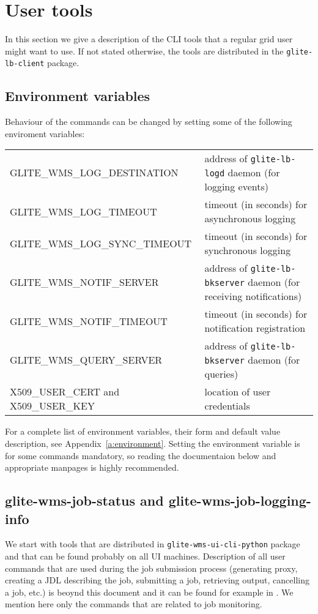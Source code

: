 \section{User tools}
\label{s:lb-tools}

In this section we give a description of the CLI tools that a regular grid user
might want to use. If not stated otherwise, the tools are distributed in the
\verb'glite-lb-client' package.

\subsection{Environment variables}

Behaviour of the commands can be changed by setting some of the following
enviroment variables:

\begin{tabularx}{\textwidth}{lX}
GLITE\_WMS\_LOG\_DESTINATION & address of \verb'glite-lb-logd' daemon (for logging events)\\
GLITE\_WMS\_LOG\_TIMEOUT & timeout (in seconds) for asynchronous logging\\
GLITE\_WMS\_LOG\_SYNC\_TIMEOUT & timeout (in seconds) for synchronous logging\\
GLITE\_WMS\_NOTIF\_SERVER& address of \verb'glite-lb-bkserver' daemon (for receiving notifications)\\
GLITE\_WMS\_NOTIF\_TIMEOUT& timeout (in seconds) for notification registration\\
GLITE\_WMS\_QUERY\_SERVER& address of \verb'glite-lb-bkserver' daemon (for queries)\\
X509\_USER\_CERT and X509\_USER\_KEY & location of user credentials\\
\end{tabularx}

For a complete list of environment variables, their form and default value
description, see Appendix~\ref{a:environment}. Setting the environment variable
is for some commands mandatory, so reading the documentaion below and
appropriate manpages is highly recommended.


\subsection{glite-wms-job-status and glite-wms-job-logging-info}

We start with tools that are distributed in \verb'glite-wms-ui-cli-python' package
and that can be found probably on all UI machines. Description of all user
commands that are used during the job submission process (generating proxy,
creating a JDL describing the job, submitting a job, retrieving output,
cancelling a job, etc.) is beoynd this document and it can be found for example
in \cite{wmsug}. We mention here only the commands that are related to
job monitoring.

